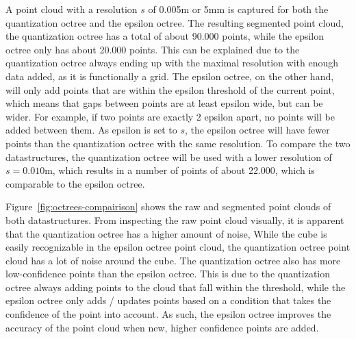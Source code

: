 A point cloud with a resolution $s$ of 0.005m or 5mm is captured for both the quantization octree and the epsilon octree.
The resulting segmented point cloud, the quantization octree has a total of about 90.000 points,
while the epsilon octree only has about 20.000 points.
This can be explained due to the quantization octree always ending up with the maximal resolution
with enough data added, as it is functionally a grid.
The epsilon octree, on the other hand, will only add points that are within the epsilon threshold of the current point,
which means that gaps between points are at least epsilon wide, but can be wider.
For example, if two points are exactly 2 epsilon apart, no points will be added between them.
As epsilon is set to $s$, the epsilon octree will have fewer points than the quantization octree with the same resolution.
To compare the two datastructures, the quantization octree will be used with a lower resolution of $s=0.010$m,
which results in a number of points of about 22.000, which is comparable to the epsilon octree.

Figure~\ref{fig:octrees-compairison} shows the raw and segmented point clouds of both datastructures.
From inspecting the raw point cloud visually, it is apparent that the quantization octree has a higher amount of noise,
While the cube is easily recognizable in the epsilon octree point cloud, the quantization octree point cloud has a lot of noise around the cube.
The quantization octree also has more low-confidence points than the epsilon octree.
This is due to the quantization octree always adding points to the cloud that fall within the threshold,
while the epsilon octree only adds / updates points based on a condition that takes the confidence of the point into account.
As such, the epsilon octree improves the accuracy of the point cloud when new, higher confidence points are added.


